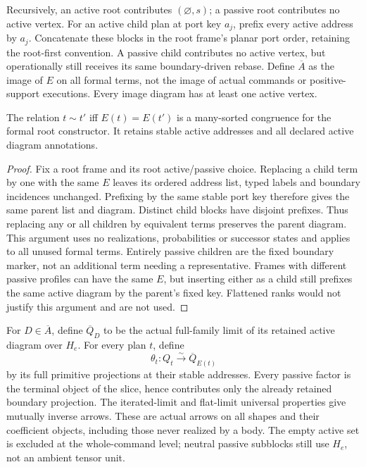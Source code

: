 \documentclass[11pt]{article}
\begin{document}
Recursively, an active root contributes $(\varnothing,s)$; a passive root contributes no active vertex. For an active child plan at port key $a_j$, prefix every active address by $a_j$. Concatenate these blocks in the root frame's planar port order, retaining the root-first convention. A passive child contributes no active vertex, but operationally still receives its same boundary-driven rebase. Define $\overline A$ as the image of $E$ on all formal terms, not the image of actual commands or positive-support executions. Every image diagram has at least one active vertex.

\begin{proposition}
The relation $t\sim t'$ iff $E(t)=E(t')$ is a many-sorted congruence for the formal root constructor. It retains stable active addresses and all declared active diagram annotations.
\end{proposition}
\begin{proof}
Fix a root frame and its root active/passive choice. Replacing a child term by one with the same $E$ leaves its ordered address list, typed labels and boundary incidences unchanged. Prefixing by the same stable port key therefore gives the same parent list and diagram. Distinct child blocks have disjoint prefixes. Thus replacing any or all children by equivalent terms preserves the parent diagram. This argument uses no realizations, probabilities or successor states and applies to all unused formal terms. Entirely passive children are the fixed boundary marker, not an additional term needing a representative. Frames with different passive profiles can have the same $E$, but inserting either as a child still prefixes the same active diagram by the parent's fixed key. Flattened ranks would not justify this argument and are not used.
\end{proof}

For $D\in\overline A$, define $\overline Q_D$ to be the actual full-family limit of its retained active diagram over $H_e$. For every plan $t$, define
\[
 \theta_t:Q_t\xrightarrow{\sim}\overline Q_{E(t)}
\]
by its full primitive projections at their stable addresses. Every passive factor is the terminal object of the slice, hence contributes only the already retained boundary projection. The iterated-limit and flat-limit universal properties give mutually inverse arrows. These are actual arrows on all shapes and their coefficient objects, including those never realized by a body. The empty active set is excluded at the whole-command level; neutral passive subblocks still use $H_e$, not an ambient tensor unit.
\end{document}
